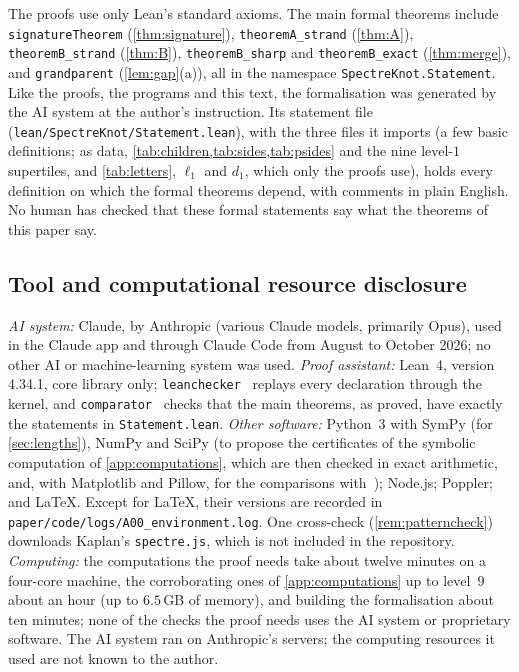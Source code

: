 \documentclass[11pt]{amsart}
\theoremstyle{definition}
\theoremstyle{remark}
\newcommand{\code}[1]{\texttt{#1}}
\begin{document}
The proofs use only Lean's standard axioms. The main formal theorems include \code{signatureTheorem}
(\cref{thm:signature}), \code{theoremA\_strand} (\cref{thm:A}), \code{theoremB\_strand} (\cref{thm:B}),
\code{theoremB\_sharp} and \code{theoremB\_exact} (\cref{thm:merge}), and \code{grandparent} (\cref{lem:gap}(a)), all
in the name\-space \code{SpectreKnot.Statement}. Like the proofs, the programs and this text, the formalisation was generated by the AI system at
the author's instruction. Its statement file (\code{lean/SpectreKnot/Statement.lean}), with the three files it imports
(a few basic definitions; as data, \cref{tab:children,tab:sides,tab:psides} and the nine level-$1$ supertiles, and
\cref{tab:letters}, $\ell_1$ and $d_1$, which only the proofs use), holds every definition on which the formal theorems depend, with comments in plain English. No human has checked that these
formal statements say what the theorems of this paper say.

\subsection*{Tool and computational resource disclosure}
\emph{AI system:} Claude, by Anthropic (various Claude models, primarily Opus), used in the Claude app and through
Claude Code from August to October 2026; no other AI or machine-learning system was used. \emph{Proof assistant:}
Lean~4, version 4.34.1, core library only; \code{leanchecker}~\cite{Leanchecker} replays every declaration through
the kernel, and \code{comparator}~\cite{Comparator} checks that the main theorems, as proved, have exactly the
statements in \code{Statement.lean}. \emph{Other software:} Python~3 with SymPy (for \cref{sec:lengths}), NumPy and
SciPy (to propose the certificates of the symbolic computation of \cref{app:computations}, which are then checked in
exact arithmetic, and, with Matplotlib and Pillow, for the comparisons with~\cite{SMKGS-spectre}); Node.js; Poppler;
and \LaTeX. Except for \LaTeX, their versions are recorded in \code{paper/code/logs/A00\_environment.log}. One
cross-check (\cref{rem:patterncheck}) downloads Kaplan's \code{spectre.js}, which is not included in the repository.
\emph{Computing:} the computations the proof needs take about twelve minutes on a four-core machine, the corroborating
ones of \cref{app:computations} up to level~$9$ about an hour (up to $6.5$\,GB of memory), and building the
formalisation about ten minutes; none of the checks the proof needs uses the AI system or proprietary software. The AI
system ran on Anthropic's servers; the computing resources it used are not known to the author.



\end{document}
